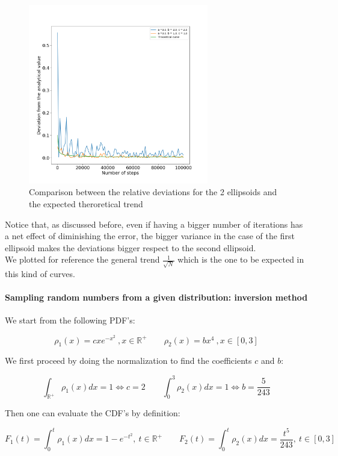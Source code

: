 \begin{figure}[H]
  \centering
  \includegraphics[width=0.7\textwidth]{FIG/exercise_0_images/relative_error_trend.png}
  \caption{Comparison between the relative deviations for the 2 ellipsoids and the expected theroretical trend}
  \label{lec1:deviation_comparison}
  \end{figure}

Notice that, as discussed before, even if having a bigger number of iterations has a net effect of diminishing the error, the bigger variance in 
the case of the first ellipsoid makes the deviations bigger respect to the second ellipsoid. \\
We plotted for reference the general trend $\frac{1}{\sqrt{N}}$ which is the one to be expected in this kind of curves.  


\paragraph{Sampling random numbers from a given distribution: inversion method}

We start from the following PDF's:

$$ \rho_1(x) = cxe^{-x^2}\ ,x \in \mathbb{R}^+ \qquad \rho_2(x) = bx^4\ , x \in [0,3]$$

We first proceed by doing the normalization to find the coefficients $c$ and $b$:

$$ \int_{\mathbb{R}^+}\rho_1(x)dx =1 \iff c=2 \qquad \int_{0}^3\rho_2(x)dx =1 \iff b = \frac{5}{243} $$

Then one can evaluate the CDF's by definition:

$$ F_1(t)=\int_{0}^t\rho_1(x)dx = 1-e^{-t^2}, \ t \in \mathbb{R}^+ \qquad F_2(t)=\int_{0}^t\rho_2(x)dx = \frac{t^5}{243}, \ t \in [0,3] $$

